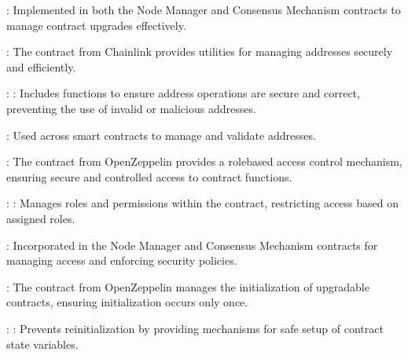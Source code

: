 \documentclass[letterpaper,10pt,english]{sphinxmanual}
\let\sphinxpxdimen\pdfpxdimen\else\newdimen\sphinxpxdimen
\begin{document}
\sphinxAtStartPar
{}:
Implemented in both the Node Manager and Consensus Mechanism contracts to manage contract upgrades effectively.

\noindent{\hspace*{\fill}\sphinxincludegraphics[width=600\sphinxpxdimen]{{_static/proxy-contract}.png}\hspace*{\fill}}

\sphinxAtStartPar
{}

\sphinxAtStartPar
{}:
The  contract from Chainlink provides utilities for managing addresses securely and efficiently.

\sphinxAtStartPar
{}:
\sphinxhyphen{} : Includes functions to ensure address operations are secure and correct, preventing the use of invalid or malicious addresses.

\sphinxAtStartPar
{}:
Used across smart contracts to manage and validate addresses.

\sphinxAtStartPar
{}

\sphinxAtStartPar
{}:
The  contract from OpenZeppelin provides a role\sphinxhyphen{}based access control mechanism, ensuring secure and controlled access to contract functions.

\sphinxAtStartPar
{}:
\sphinxhyphen{} : Manages roles and permissions within the contract, restricting access based on assigned roles.

\sphinxAtStartPar
{}:
Incorporated in the Node Manager and Consensus Mechanism contracts for managing access and enforcing security policies.

\sphinxAtStartPar
{}

\sphinxAtStartPar
{}:
The  contract from OpenZeppelin manages the initialization of upgradable contracts, ensuring initialization occurs only once.

\sphinxAtStartPar
{}:
\sphinxhyphen{} : Prevents reinitialization by providing mechanisms for safe setup of contract state variables.
\end{document}
